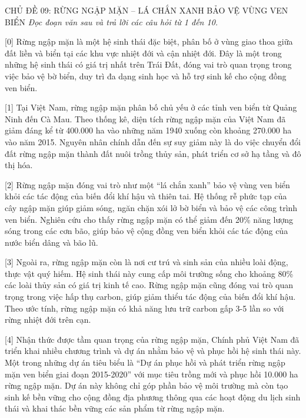 \documentclass[12pt,a4paper,twoside]{article}
\newenvironment{readingpassage}[1][]{%
    \begin{tcolorbox}[enhanced, colback=grayLight, colframe=secondaryBlue,
        coltitle=textDark, fonttitle=\bfseries, title={#1},
        rounded corners, arc=3mm, boxrule=1pt,
        left=15pt, right=15pt, top=10pt, bottom=10pt,
        breakable, before skip=10pt, after skip=10pt, drop fuzzy shadow]
    \setstretch{1.3}
}{\end{tcolorbox}}
\begin{document}
\newpage
\label{a_cd09}
\begin{topicbox}{\large CHỦ ĐỀ 09: RỪNG NGẬP MẶN -- LÁ CHẮN XANH BẢO VỆ VÙNG VEN BIỂN}
\vspace{8pt}
\textit{Đọc đoạn văn sau và trả lời các câu hỏi từ 1 đến 10.}
\vspace{6pt}
\end{topicbox}
\vspace{5pt}
\begin{readingpassage}[]
[0] Rừng ngập mặn là một hệ sinh thái đặc biệt, phân bố ở vùng giao thoa giữa đất liền và biển tại các khu vực nhiệt đới và cận nhiệt đới. Đây là một trong những hệ sinh thái có giá trị nhất trên Trái Đất, đóng vai trò quan trọng trong việc bảo vệ bờ biển, duy trì đa dạng sinh học và hỗ trợ sinh kế cho cộng đồng ven biển.

[1] Tại Việt Nam, rừng ngập mặn phân bố chủ yếu ở các tỉnh ven biển từ Quảng Ninh đến Cà Mau. Theo thống kê, diện tích rừng ngập mặn của Việt Nam đã giảm đáng kể từ 400.000 ha vào những năm 1940 xuống còn khoảng 270.000 ha vào năm 2015. Nguyên nhân chính dẫn đến sự suy giảm này là do việc chuyển đổi đất rừng ngập mặn thành đất nuôi trồng thủy sản, phát triển cơ sở hạ tầng và đô thị hóa.

[2] Rừng ngập mặn đóng vai trò như một ``lá chắn xanh'' bảo vệ vùng ven biển khỏi các tác động của biến đổi khí hậu và thiên tai. Hệ thống rễ phức tạp của cây ngập mặn giúp giảm sóng, ngăn chặn xói lở bờ biển và bảo vệ các công trình ven biển. Nghiên cứu cho thấy rừng ngập mặn có thể giảm đến 20\% năng lượng sóng trong các cơn bão, giúp bảo vệ cộng đồng ven biển khỏi các tác động của nước biển dâng và bão lũ.

[3] Ngoài ra, rừng ngập mặn còn là nơi cư trú và sinh sản của nhiều loài động, thực vật quý hiếm. Hệ sinh thái này cung cấp môi trường sống cho khoảng 80\% các loài thủy sản có giá trị kinh tế cao. Rừng ngập mặn cũng đóng vai trò quan trọng trong việc hấp thụ carbon, giúp giảm thiểu tác động của biến đổi khí hậu. Theo ước tính, rừng ngập mặn có khả năng lưu trữ carbon gấp 3-5 lần so với rừng nhiệt đới trên cạn.

[4] Nhận thức được tầm quan trọng của rừng ngập mặn, Chính phủ Việt Nam đã triển khai nhiều chương trình và dự án nhằm bảo vệ và phục hồi hệ sinh thái này. Một trong những dự án tiêu biểu là ``Dự án phục hồi và phát triển rừng ngập mặn ven biển giai đoạn 2015-2020'' với mục tiêu trồng mới và phục hồi 10.000 ha rừng ngập mặn. Dự án này không chỉ góp phần bảo vệ môi trường mà còn tạo sinh kế bền vững cho cộng đồng địa phương thông qua các hoạt động du lịch sinh thái và khai thác bền vững các sản phẩm từ rừng ngập mặn.


\end{readingpassage}
\end{document}
